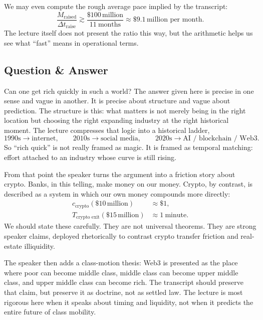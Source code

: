 We may even compute the rough average pace implied by the transcript:
\begin{equation}
\frac{M_{\text{raised}}}{\Delta t_{\text{raise}}}
\gtrsim
\frac{\$100\,\text{million}}{11\ \text{months}}
\approx
\$9.1\,\text{million per month}.
\end{equation}
The lecture itself does not present the ratio this way, but the arithmetic helps us see what ``fast'' means in operational terms.

\subsection{Question \& Answer}

Can one get rich quickly in such a world? The answer given here is precise in one sense and vague in another. It is precise about structure and vague about prediction. The structure is this: what matters is not merely being in the right location but choosing the right expanding industry at the right historical moment. The lecture compresses that logic into a historical ladder,
\begin{equation}
1990\text{s} \to \text{internet},
\qquad
2010\text{s} \to \text{social media},
\qquad
2020\text{s} \to \text{AI / blockchain / Web3}.
\end{equation}
So ``rich quick'' is not really framed as magic. It is framed as temporal matching: effort attached to an industry whose curve is still rising.

From that point the speaker turns the argument into a friction story about crypto. Banks, in this telling, make money on our money. Crypto, by contrast, is described as a system in which our own money compounds more directly:
\begin{align}
c_{\text{crypto}}(\$10\,\text{million}) &\approx \$1, \\
T_{\text{crypto exit}}(\$15\,\text{million}) &\approx 1\ \text{minute}.
\end{align}
We should state these carefully. They are not universal theorems. They are strong speaker claims, deployed rhetorically to contrast crypto transfer friction and real-estate illiquidity.

The speaker then adds a class-motion thesis: Web3 is presented as the place where poor can become middle class, middle class can become upper middle class, and upper middle class can become rich. The transcript should preserve that claim, but preserve it as doctrine, not as settled law. The lecture is most rigorous here when it speaks about timing and liquidity, not when it predicts the entire future of class mobility.

